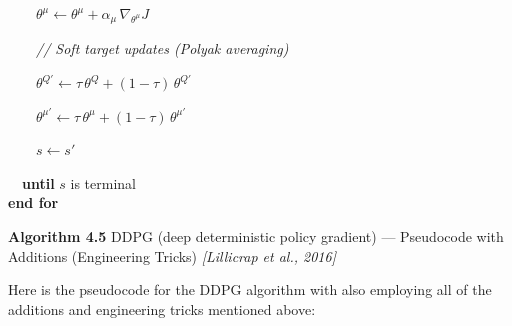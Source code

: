 \documentclass[11pt]{article}
\begin{document}
\begin{pseudobox}
\strut ~~~~\(\theta^{\mu} \leftarrow \theta^{\mu} + \alpha_\mu\, \nabla_{\theta^{\mu}} J\)\\
\strut ~~~~\emph{// Soft target updates (Polyak averaging)}\\
\strut ~~~~\(\theta^{Q'} \leftarrow \tau\, \theta^{Q} + (1 - \tau)\, \theta^{Q'}\)\\
\strut ~~~~\(\theta^{\mu'} \leftarrow \tau\, \theta^{\mu} + (1 - \tau)\, \theta^{\mu'}\)\\
\strut ~~~~\(s \leftarrow s'\)\\
\strut ~~\textbf{until} \(s\) is terminal\\
\textbf{end for}

\end{pseudobox}

    \begin{pseudobox}

\textbf{Algorithm 4.5} DDPG (deep deterministic policy gradient) ---
Pseudocode with Additions (Engineering Tricks) \emph{{[}Lillicrap et
al., 2016{]}}

\tcbline

Here is the pseudocode for the DDPG algorithm with also employing all of
the additions and engineering tricks mentioned above:


\end{pseudobox}
\end{document}

